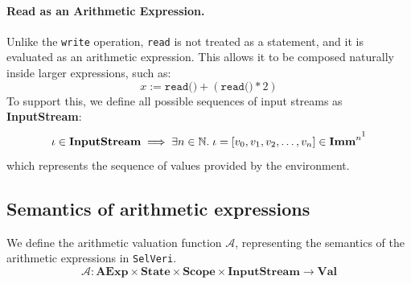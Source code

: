 \documentclass{article}
\begin{document}
\paragraph{Read as an Arithmetic Expression.}
Unlike the \texttt{write} operation, \texttt{read} is not treated as a statement, and it is evaluated as an arithmetic expression. This allows it to be composed naturally inside larger expressions, such as:
\[
    x := \texttt{read()} + (\texttt{read()} * 2)
\]
To support this, we define all possible sequences of input streams as \textbf{InputStream}:
\[
    \iota \in \textbf{InputStream}  \implies \exists n \in \mathbb{N}.\; \iota = [v_0, v_1, v_2, \dots, v_n] \in \textbf{Imm}^{n\footnotemark} 
\]
which represents the sequence of values provided by the environment.

\newpage
\subsection{Semantics of arithmetic expressions}

We define the arithmetic valuation function $\mathcal{A}$, representing the semantics of the arithmetic expressions in \texttt{SelVeri}.
\[
\mathcal{A} : \textbf{AExp} \times \textbf{State} \times \textbf{Scope} \times \textbf{InputStream} \to \textbf{Val} 
\]
\end{document}
